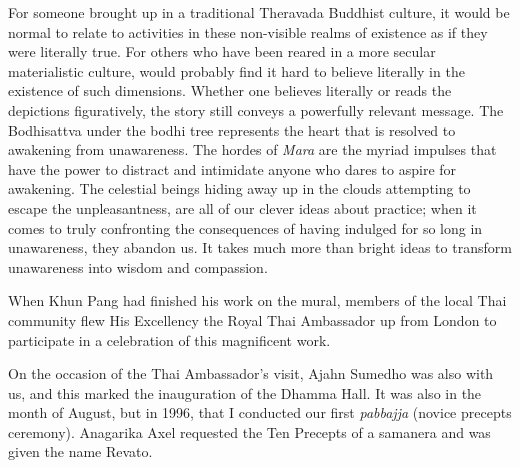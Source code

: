 For someone brought up in a traditional Theravada Buddhist culture, it
would be normal to relate to activities in these non-visible realms of
existence as if they were literally true. For others who have been reared
in a more secular materialistic culture, would probably find it hard to
believe literally in the existence of such dimensions. Whether one
believes literally or reads the depictions figuratively, the story still
conveys a powerfully relevant message. The Bodhisattva under the bodhi
tree represents the heart that is resolved to awakening from
unawareness. The hordes of \emph{Mara} are the myriad impulses that have
the power to distract and intimidate anyone who dares to aspire for
awakening. The celestial beings hiding away up in the clouds attempting
to escape the unpleasantness, are all of our clever ideas about
practice; when it comes to truly confronting the consequences of having
indulged for so long in unawareness, they abandon us. It takes much more
than bright ideas to transform unawareness into wisdom and compassion.

When Khun Pang had finished his work on the mural, members of the local
Thai community flew His Excellency the Royal Thai Ambassador up from
London to participate in a celebration of this magnificent work.

On the occasion of the Thai Ambassador's visit, Ajahn Sumedho was also
with us, and this marked the inauguration of the Dhamma Hall. It was also in the month of August, but in 1996, that I conducted our first \emph{pabbajja} (novice
precepts ceremony). Anagarika Axel requested the Ten Precepts of a
samanera and was given the name Revato.
